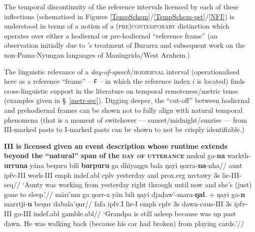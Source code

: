 The temporal discontinuity of the reference intervals licensed by each of these inflections (schematised in Figures \ref{TempSchem}/\ref{TempSchem-pst}/\ref{NFI}) is understood in terms of a notion of a \textsc{(pre)contemporary} distinction which operates over either a hodiernal or pre-hodiernal ``reference frame'' (an observation initially due to \citeauthor{Glasgow1964}'s treatment of Burarra and subsequent work on the non-Pama-Nyungan languages of Maningrida/West Arnhem.)

The linguistic relevance of a \textit{day-of-speech}/\textsc{hodiernal} interval (operationalised here as a reference ``frame'' -- \texttt{F} -- in which the reference index $ i $ is located) finds cross-linguistic support in the literature on temporal remoteness/metric tense (examples given in \S~\ref{metr-sec}). Digging deeper, the ``cut-off'' between hodiernal and prehodiernal frames can be shown not to fully align with natural temporal phenomena (that is a moment of switchover --- sunset/midnight/sunrise --- from \gls{III}-marked pasts to \gls{I}-marked pasts can be shown to not be crisply identifiable.)



\pex\textbf{\gls{III} is licensed given an event description whose runtime extends beyond the ``natural'' span of the \textsc{day of utterance} }
\a\begingl
\gla mukul ga-\textbf{na} warkth-\textbf{urruna} yäna beŋuru bili \textbf{barpuru} ga dhiyaŋgu bala ŋayi ŋorra-\textbf{na}-nha//
\glb aunt \gls{ipfv}-\gls{III} work-\gls{III} \gls{emph} \gls{indef}.\gls{abl} \gls{cplv} yesterday and \gls{prox}.\gls{erg} \gls{mvtawy} 3s lie-\gls{III}-\gls{seq}//
\glft`Aunty was working from yesterday right through until now and she's (just) gone to sleep.'\trailingcitation{[DB~20190405]}//\endgl
\a\begingl
\gla märi’mu ga ŋorr-a yän bili ŋayi djaḏaw’-mara-\textbf{ŋal}. + ŋayi ga-\textbf{n} marrtji-\textbf{n} \nogloss{[...]} beŋur dabala'ŋur//
\glb \gls{fa}\gls{fa} \gls{ipfv}.\gls{I} lie-\gls{I} \gls{emph} \gls{cplv} 3s dawn-\gls{caus}-\gls{III} 3s \gls{ipfv}-\gls{III} go-\gls{III} \gls{indef}.\gls{abl} gamble.\gls{abl}//
\glft`Grandpa is still asleep because was up past dawn. He was walking back (because his car had broken) from playing cards.'\trailingcitation{[AW~20190410]}//\endgl
\xe

